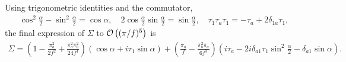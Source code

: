 Using trigonometric identities and the commutator,
\begin{align*}
    \cos^2{\frac{\alpha}{2}} - \sin^2{\frac{\alpha}{2}} = \cos{\alpha}, \quad 
    2 \cos{\frac{\alpha}{2}} \sin{\frac{\alpha}{2}} = \sin{\frac{\alpha}{2}}, \quad
    \tau_1 \tau_a \tau_1
    = -\tau_a + 2 \delta_{1a}\tau_1,
\end{align*}
the final expression of $\Sigma$ to $\Oh[5]{(\pi/f)}$ is
\begin{align}
    \Sigma =
     \left(
        1 
        - \frac{\pi_a^2}{2f^2}
        + \frac{\pi_a^2\pi_b^2}{24f^4}
    \right)
    (\cos{\alpha} + i \tau_1 \sin{\alpha})
    +
    \left(
        \frac{\pi_a}{f} 
        - \frac{\pi_b^2\pi_a}{6f^3} 
    \right)
    \left(
        i\tau_a - 2i \delta_{a1}\tau_1\sin^2{\frac{\alpha}{2}} - \delta_{a1} \sin{\alpha}
    \right).
    \label{expansion of sigma}
\end{align}

